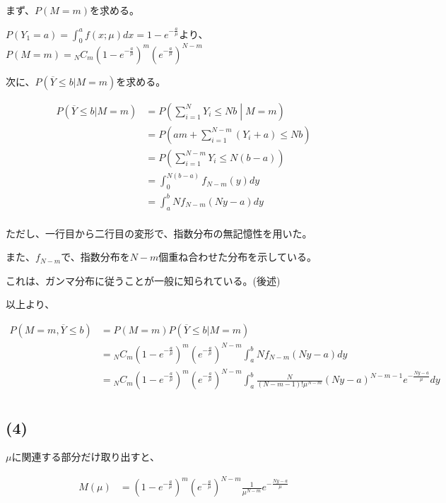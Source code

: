 \documentclass[a4paper, 10pt, dvipdfmx]{jlreq}
\begin{document}
まず、$P(M=m)$を求める。

$P(Y_1=a)=\int_0^a{f(x;\mu)}dx=1-e^{-\frac{a}{\mu}}$より、$P(M=m) = {}_NC_m (1-e^{-\frac{a}{\mu}})^m(e^{-\frac{a}{\mu}})^{N-m}$

次に、$P(\overline{Y}\leq b | M=m)$を求める。

\begin{align*}
    P(\overline{Y}\leq b | M=m) & = P\left( \sum_{i=1}^N Y_i \leq Nb \middle| M=m \right)  \\
                                & = P\left( am + \sum_{i=1}^{N-m} (Y_i+a)  \leq Nb \right) \\
                                & = P\left( \sum_{i=1}^{N-m} Y_i  \leq N(b-a) \right)      \\
                                & = \int_0^{N(b-a)} f_{N-m}(y) dy                          \\
                                & = \int_a^{b} Nf_{N-m}(Ny-a) dy                           \\
\end{align*}

ただし、一行目から二行目の変形で、指数分布の無記憶性を用いた。

また、$f_{N-m}$で、指数分布を$N-m$個重ね合わせた分布を示している。

これは、ガンマ分布に従うことが一般に知られている。(後述)

以上より、

\begin{align*}
    P(M=m,\overline{Y}\leq b) & = P(M=m)P(\overline{Y} \leq b|M=m)                                                                                                          \\
                              & = {}_NC_m (1-e^{-\frac{a}{\mu}})^m(e^{-\frac{a}{\mu}})^{N-m} \int_a^{b} N f_{N-m}(Ny-a) dy                                                  \\
                              & = {}_NC_m (1-e^{-\frac{a}{\mu}})^m(e^{-\frac{a}{\mu}})^{N-m} \int_a^{b} \frac{N}{(N-m-1)!\mu^{N-m}} (Ny-a)^{N-m-1} e^{-\frac{Ny-a}{\mu}} dy \\
\end{align*}

\subsection*{(4)}

$\mu$に関連する部分だけ取り出すと、

\begin{align*}
    M(\mu) & = (1-e^{-\frac{a}{\mu}})^m(e^{-\frac{a}{\mu}})^{N-m}  \frac{1}{\mu^{N-m}} e^{-\frac{Ny-a}{\mu}}
\end{align*}
\end{document}
